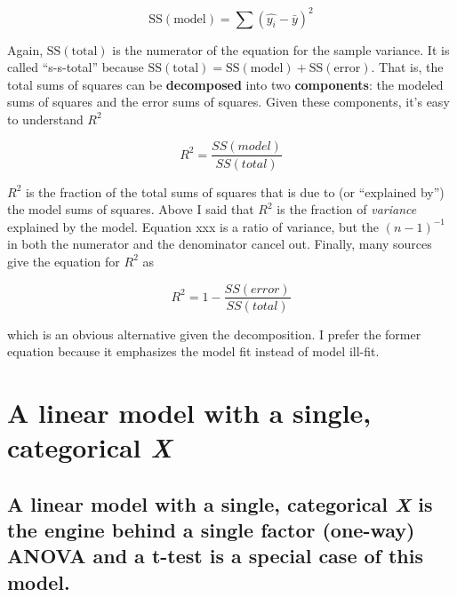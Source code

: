 \documentclass[]{book}
\theoremstyle{definition}
\theoremstyle{definition}
\theoremstyle{definition}
\theoremstyle{remark}
\begin{document}
\begin{equation}
\mathrm{SS(model)} = \sum{(\hat{y_i} - \bar{y})^2}
\end{equation}

Again, \(\mathrm{SS(total)}\) is the numerator of the equation for the
sample variance. It is called ``s-s-total'' because
\(\mathrm{SS(total)} = \mathrm{SS(model)} + \mathrm{SS(error)}\). That
is, the total sums of squares can be \textbf{decomposed} into two
\textbf{components}: the modeled sums of squares and the error sums of
squares. Given these components, it's easy to understand \(R^2\)

\begin{equation}
R^2 = \frac{SS(model)}{SS(total)}
\end{equation}

\(R^2\) is the fraction of the total sums of squares that is due to (or
``explained by'') the model sums of squares. Above I said that \(R^2\)
is the fraction of \emph{variance} explained by the model. Equation xxx
is a ratio of variance, but the \((n-1)^{-1}\) in both the numerator and
the denominator cancel out. Finally, many sources give the equation for
\(R^2\) as

\begin{equation}
R^2 = 1- \frac{SS(error)}{SS(total)}
\end{equation}

which is an obvious alternative given the decomposition. I prefer the
former equation because it emphasizes the model fit instead of model
ill-fit.

\chapter{\texorpdfstring{A linear model with a single, categorical
\emph{X}}{A linear model with a single, categorical X}}\label{a-linear-model-with-a-single-categorical-x}

\section{\texorpdfstring{A linear model with a single, categorical
\emph{X} is the engine behind a single factor (one-way) ANOVA and a
t-test is a special case of this
model.}{A linear model with a single, categorical X is the engine behind a single factor (one-way) ANOVA and a t-test is a special case of this model.}}\label{a-linear-model-with-a-single-categorical-x-is-the-engine-behind-a-single-factor-one-way-anova-and-a-t-test-is-a-special-case-of-this-model.}
\end{document}
